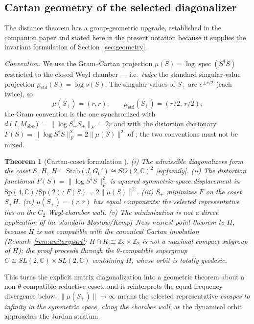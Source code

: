 \documentclass[11pt]{article}
\newtheorem{theorem}{Theorem}[section]
\theoremstyle{definition}
\theoremstyle{remark}
\newcommand{\C}{\mathbb{C}}
\newcommand{\Z}{\mathbb{Z}}
\newcommand{\Sp}{\mathrm{Sp}}
\newcommand{\Stab}{\mathrm{Stab}}
\newcommand{\Mobs}{M_{\mathrm{obs}}}
\newcommand{\dg}{\dagger}
\begin{document}
\subsection{Cartan geometry of the selected diagonalizer}
\label{ssec:cartan}

The distance theorem has a group-geometric upgrade, established in the
companion paper \cite{companionMD} and stated here in the present
notation because it supplies the invariant formulation of
Section~\ref{sec:geometry}.

\emph{Convention.}  We use the Gram--Cartan projection
$\mu(S)=\log\operatorname{spec}(S^{\dg}S)$ restricted to the closed Weyl
chamber --- i.e.\ \emph{twice} the standard singular-value projection
$\mu_{\mathrm{std}}(S)=\log s(S)$.  The singular values of $S_+$ are
$e^{\pm r/2}$ (each twice), so
\begin{equation}
\mu(S_+)=(r,r),\qquad \mu_{\mathrm{std}}(S_+)=(r/2,\,r/2);
\end{equation}
the Gram convention is the one synchronized with
$d(I,\Mobs)=\|\log S_+^{\dg}S_+\|_F=2r$ and with the distortion
dictionary $F(S)=\|\log S^{\dg}S\|_F^2=2\|\mu(S)\|^2$ of
\cite{companionMD}; the two conventions must not be mixed.

\begin{theorem}[Cartan-coset formulation \cite{companionMD}]
\label{thm:cartancoset}
(i) The admissible diagonalizers form the coset $S_+H$,
$H=\Stab(J,G_0')\cong SO(2,\C)^2$ \eqref{eq:family}.
(ii) The distortion functional $F(S)=\|\log S^{\dg}S\|_F^2$ is squared
symmetric-space displacement in $\Sp(4,\C)/\Sp(2)$: $F(S)=2\|\mu(S)\|^2$.
(iii) $S_+$ minimizes $F$ on the coset $S_+H$.
(iv) $\mu(S_+)=(r,r)$ has equal components: the selected representative
lies on the $C_2$ Weyl-chamber wall.
(v) The minimization is \emph{not} a direct application of the standard
Mostow/Kempf--Ness nearest-point theorem to $H$, because $H$ is not
compatible with the canonical Cartan involution
(Remark~\ref{rem:unitarypart}: $H\cap K\cong\Z_2\times\Z_2$ is not a
maximal compact subgroup of $H$); the proof proceeds through the
$\theta$-compatible supergroup $C\cong SL(2,\C)\times SL(2,\C)$
containing $H$, whose orbit is totally geodesic.
\end{theorem}

This turns the explicit matrix diagonalization into a geometric theorem
about a non-$\theta$-compatible reductive coset, and it reinterprets the
equal-frequency divergence below: $\|\mu(S_+)\|\to\infty$ means the
selected representative \emph{escapes to infinity in the symmetric space,
along the chamber wall}, as the dynamical orbit approaches the Jordan
stratum.
\end{document}
